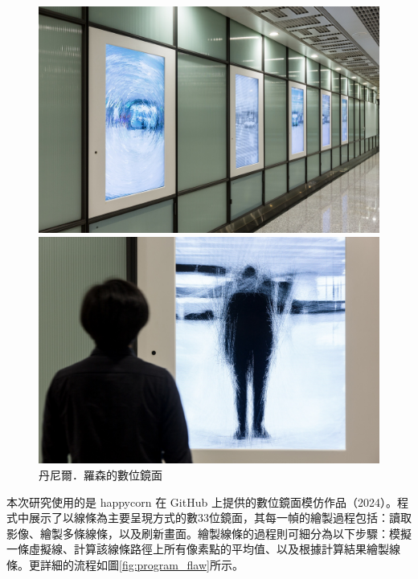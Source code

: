\documentclass[12pt]{article}
\begin{document}
\begin{figure}[htbp]
  \centering
  \begin{minipage}[b]{0.45\textwidth}
    \centering
    \includegraphics[width=\textwidth]{img/mirror_example_2.jpg}
  \end{minipage}
  \hfill
  \begin{minipage}[b]{0.45\textwidth}
    \centering
    \includegraphics[width=\textwidth]{img/mirror_example_3.jpg}
  \end{minipage}
\caption{丹尼爾．羅森的數位鏡面}\label{fig:mirror_example_23}
\end{figure}

本次研究使用的是 happycorn 在 GitHub 上提供的數位鏡面模仿作品（2024）。程式中展示了以線條為主要呈現方式的數33位鏡面，其每一幀的繪製過程包括：讀取影像、繪製多條線條，以及刷新畫面。繪製線條的過程則可細分為以下步驟：模擬一條虛擬線、計算該線條路徑上所有像素點的平均值、以及根據計算結果繪製線條。更詳細的流程如圖\ref{fig:program_flaw}所示。
\end{document}
